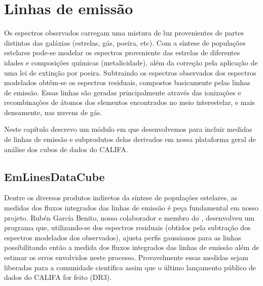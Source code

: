 


\chapter{Linhas de emissão}
\label{sec:emlines}

Os espectros observados carregam uma mistura de luz provenientes de partes distintas das galáxias
(estrelas, gás, poeira, etc). Com a síntese de populações estelares pode-se modelar os espectros
proveniente das estrelas de diferentes idades e composições químicas (metalicidade), além da
correção pela aplicação de uma lei de extinção por poeira. Subtraindo os espectros observados dos
espectros modelados obtêm-se os espectros residuais, compostos basicamente pelas linhas de emissão.
Essas linhas são geradas principalmente através das ionizações e recombinações de átomos dos
elementos encontrados no meio interestelar, e mais densamente, nas nuvens de gás.

Neste capítulo descrevo um módulo em \pyt que desenvolvemos para incluir medidas de linhas de
emissão e subprodutos delas derivados em nossa plataforma geral de análise dos cubos de dados do
CALIFA.

\section{EmLinesDataCube}
\label{sec:emline:datacube}

Dentre os diversos produtos indiretos da síntese de populações estelares, as medidas dos fluxos
integrados das linhas de emissão é peça fundamental em nosso projeto. Rubén García Benito, nosso
colaborador e membro do \PCAL, desenvolveu um programa que, utilizando-se dos espectros residuais
(obtidos pela subtração dos espectros modelados dos observados), ajusta perfis gaussianos para as
linhas possibilitando então a medida dos fluxos integrados das linhas de emissão além de estimar os
erros envolvidos neste processo. Provavelmente essas medidas sejam liberadas para a comunidade
científica assim que o último lançamento público de dados do CALIFA for feito (DR3).

